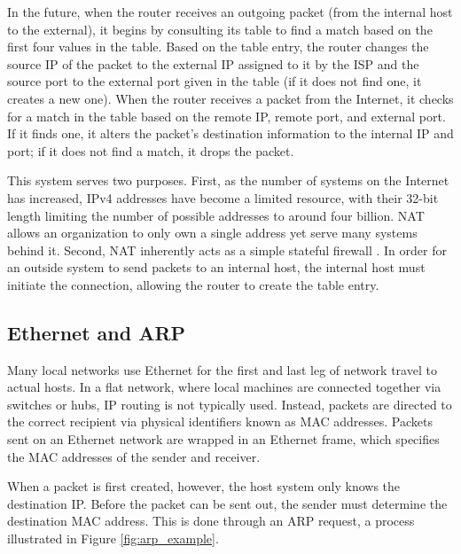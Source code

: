\par In the future, when the router receives an outgoing packet (from the internal host to the external), it begins by consulting its table to find a match based on the first four values in the table. Based on the table entry, the router changes the source \ac{IP} of the packet to the external IP assigned to it by the \ac{ISP} and the source port to the external port given in the table (if it does not find one, it creates a new one). When the router receives a packet from the Internet, it checks for a match in the table based on the remote IP, remote port, and external port. If it finds one, it alters the packet's destination information to the internal IP and port; if it does not find a match, it drops the packet.

\par This system serves two purposes. First, as the number of systems on the Internet has increased, \ac{IPv4} addresses have become a limited resource, with their 32-bit length limiting the number of possible addresses to around four billion. \ac{NAT} allows an organization to only own a single address yet serve many systems behind it. Second, \ac{NAT} inherently acts as a simple stateful firewall \cite{DynAddrMalProp}. In order for an outside system to send packets to an internal host, the internal host must initiate the connection, allowing the router to create the table entry.

\subsection{Ethernet and \acf{ARP}}
\label{sec:eth_routing}
\par Many local networks use Ethernet for the first and last leg of network travel to actual hosts. In a flat network, where local machines are connected together via switches or hubs, \ac{IP} routing is not typically used. Instead, packets are directed to the correct recipient via physical identifiers known as \ac{MAC} addresses. Packets sent on an Ethernet network are wrapped in an Ethernet frame, which specifies the \ac{MAC} addresses of the sender and receiver.

\par When a packet is first created, however, the host system only knows the destination \ac{IP}. Before the packet can be sent out, the sender must determine the destination \ac{MAC} address. This is done through an \ac{ARP} request, a process illustrated in Figure \ref{fig:arp_example}.

